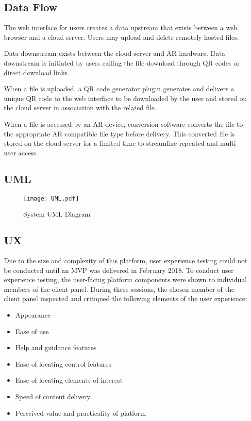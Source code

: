  \subsection{Data Flow}
The web interface for users creates a data upstream that exists between a web browser and a cloud server. Users may upload and delete remotely hosted files.

Data downstream exists between the cloud server and AR hardware. Data downstream is initiated by users calling the file download through QR codes or direct download links. 

When a file is uploaded, a QR code generator plugin generates and delivers a unique QR code to the web interface to be downloaded by the user and stored on the cloud server in association with the related file. 

When a file is accessed by an AR device, conversion software converts the file to the appropriate AR compatible file type before delivery. This converted file is stored on the cloud server for a limited time to streamline repeated and multi-user access.
  
\subsection{UML}
 
	\begin{figure}[H]
	 	\centering
		\texttt{[image: UML.pdf]}
		\caption{System UML Diagram} 
	 	\label{fig:SystemUML}	
	\end{figure}
    
\subsection{UX}

Due to the size and complexity of this platform, user experience testing could not be conducted until an MVP was delivered in February 2018. To conduct user experience testing, the user-facing platform components were shown to individual members of the client panel. During these sessions, the chosen member of the client panel inspected and critiqued the following elements of the user experience:

\begin{itemize}
	\item Appearance
	\item Ease of use
	\item Help and guidance features
    \item Ease of locating control features 
    \item Ease of locating elements of interest
    \item Speed of content delivery 
    \item Perceived value and practicality of platform
\end{itemize}




